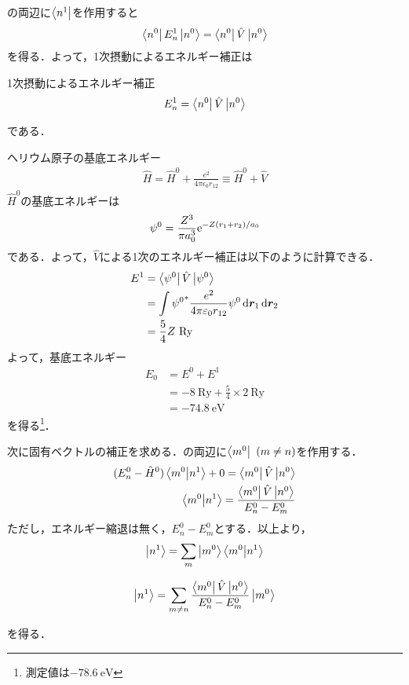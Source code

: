 \documentclass{report}
\begin{document}
  の両辺に$\bra{n^1}$を作用すると
  \begin{align}
    \bra{n^0}E_n^1\ket{n^0} = \bra{n^0}\hat{V}\ket{n^0}
  \end{align}
  を得る．よって，1次摂動によるエネルギー補正は
  \begin{itembox}[l]{1次摂動によるエネルギー補正}
    \begin{align}
      E_n^1 = \bra{n^0}\hat{V}\ket{n^0}
    \end{align}
  \end{itembox}
  である．
  \begin{myex}{ヘリウム原子の基底エネルギー}{}
    \begin{align}
      \hat{H} = \hat{H}^0 + \frac{e^2}{4\pi\epsilon_0r_{12}}\equiv\hat{H}^0 + \hat{V}
    \end{align}
    $\hat{H}^0$の基底エネルギーは
    \begin{align}
      \psi^0 = \frac{Z^3}{\pi a_0^3}\mathrm{e}^{-Z(r_1+r_2)/a_0}
    \end{align}
    である．よって，$\hat{V}$による1次のエネルギー補正は以下のように計算できる．
    \begin{align}
      E^1 &= \bra{\psi^0}\hat{V}\ket{\psi^0}\\
      &= \int{\psi^0}^{*}\frac{e^2}{4\pi\varepsilon_0r_{12}}\psi^0\dd{\bm{r}_1}\dd{\bm{r}_2} \\
      &= \frac{5}{4}Z\ \mathrm{Ry}
    \end{align}
    よって，基底エネルギー
    \begin{align}
      E_0&=E^0+E^1\\
      &= -8\ \mathrm{Ry}+\frac{5}{4}\times{2}\ \mathrm{Ry}\\
      &= -74.8\ \mathrm{eV}
    \end{align}
    を得る\footnote{測定値は$-78.6\ \mathrm{eV}$}．
  \end{myex}
  次に固有ベクトルの補正を求める．の両辺に$\bra{m^0}\ (m\ne n)$を作用する．
  \begin{align}
    (E_n^0-\hat{H}^0)\bra{m^0}\ket{n^1}+0=\bra{m^0}\hat{V}\ket{n^0}\\
    \braket{m^0}{n^1}=\frac{\bra{m^0}\hat{V}\ket{n^0}}{E_n^0-E_m^0}\\
  \end{align}
  ただし，エネルギー縮退は無く，$E_n^0-E_m^0$とする．以上より，
  \begin{align}
    \ket{n^1} = \sum_{m}\ket{m^0}\braket{m^0}{n^1}
  \end{align}
    \begin{screen}
      \begin{align}
        \ket{n^1} = \sum_{m\ne n}\frac{\bra{m^0}\hat{V}\ket{n^0}}{E_n^0 - E_m^0}\ket{m^0}
      \end{align}
    \end{screen}
  を得る．
\end{document}

